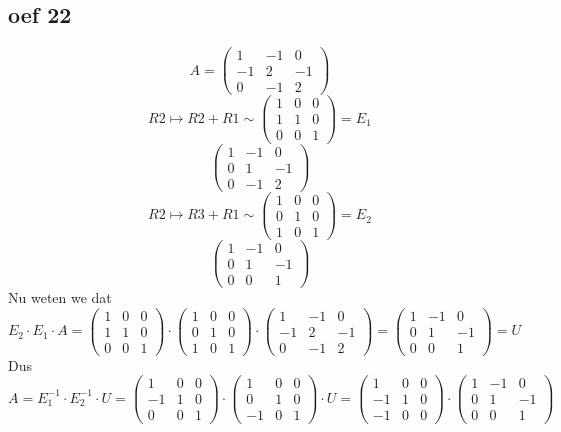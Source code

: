 \documentclass[10pt,a4paper]{article}
\begin{document}
\subsection*{oef 22}
\[
A=
\begin{pmatrix}
1 & -1 & 0 \\
-1 & 2 & -1 \\
0 & -1 & 2 
\end{pmatrix}
\]
\[
R2 \longmapsto R2+R1 \sim
\begin{pmatrix}
1 & 0 & 0\\
1 & 1 & 0\\
0 & 0 & 1 
\end{pmatrix}
=E_1
\]
\[
\begin{pmatrix}
1 & -1 & 0 \\
0 & 1 & -1 \\
0 & -1 & 2  
\end{pmatrix}
\]
\[
R2 \longmapsto R3+R1 \sim
\begin{pmatrix}
1 & 0 & 0\\
0 & 1 & 0\\
1 & 0 & 1 
\end{pmatrix}
=E_2
\]
\[
\begin{pmatrix}
1 & -1 & 0 \\
0 & 1 & -1 \\
0 & 0 & 1 
\end{pmatrix}
\]
Nu weten we dat
\[
E_2 \cdot E_1 \cdot A 
=
\begin{pmatrix}
1 & 0 & 0\\
1 & 1 & 0\\
0 & 0 & 1 
\end{pmatrix}
\cdot
\begin{pmatrix}
1 & 0 & 0\\
0 & 1 & 0\\
1 & 0 & 1 
\end{pmatrix}
\cdot
\begin{pmatrix}
1 & -1 & 0 \\
-1 & 2 & -1 \\
0 & -1 & 2 
\end{pmatrix}
=
\begin{pmatrix}
1 & -1 & 0 \\
0 & 1 & -1 \\
0 & 0 & 1 
\end{pmatrix}
= U
\]
Dus
\[
A = E_1^{-1} \cdot E_2^{-1} \cdot U
=
\begin{pmatrix}
1 & 0 & 0\\
-1 & 1 & 0\\
0 & 0 & 1 
\end{pmatrix}
\cdot
\begin{pmatrix}
1 & 0 & 0\\
0 & 1 & 0\\
-1 & 0 & 1 
\end{pmatrix}
\cdot
U
=
\begin{pmatrix}
1 & 0 & 0\\
-1 & 1 & 0\\
-1 & 0 & 0
\end{pmatrix}
\cdot
\begin{pmatrix}
1 & -1 & 0 \\
0 & 1 & -1 \\
0 & 0 & 1 
\end{pmatrix}
\]
\end{document}
